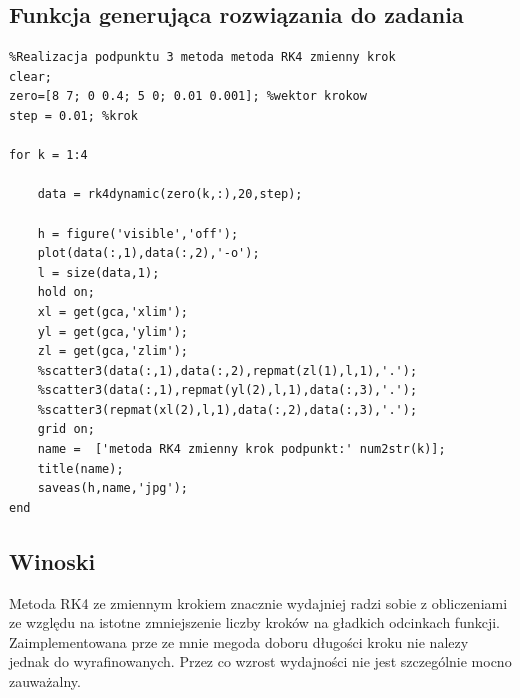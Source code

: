 \documentclass[a4paper, 11pt]{article}
\begin{document}
\subsection{Funkcja generująca rozwiązania do zadania}
\begin{lstlisting}
%Realizacja podpunktu 3 metoda metoda RK4 zmienny krok
clear; 
zero=[8 7; 0 0.4; 5 0; 0.01 0.001]; %wektor krokow
step = 0.01; %krok

for k = 1:4
    
    data = rk4dynamic(zero(k,:),20,step);
    
    h = figure('visible','off');
    plot(data(:,1),data(:,2),'-o');
    l = size(data,1);
    hold on;
    xl = get(gca,'xlim');
    yl = get(gca,'ylim');
    zl = get(gca,'zlim');
    %scatter3(data(:,1),data(:,2),repmat(zl(1),l,1),'.');
    %scatter3(data(:,1),repmat(yl(2),l,1),data(:,3),'.');
    %scatter3(repmat(xl(2),l,1),data(:,2),data(:,3),'.');
    grid on; 
    name =  ['metoda RK4 zmienny krok podpunkt:' num2str(k)];
    title(name);
    saveas(h,name,'jpg'); 
end
\end{lstlisting}
%

\subsection{Winoski}
Metoda RK4 ze zmiennym krokiem znacznie wydajniej radzi sobie z obliczeniami ze względu na istotne zmniejszenie liczby kroków na gładkich odcinkach funkcji. Zaimplementowana prze ze mnie megoda doboru długości kroku nie nalezy jednak do wyrafinowanych. Przez co wzrost wydajności nie jest szczególnie mocno zauważalny. 
\end{document}

